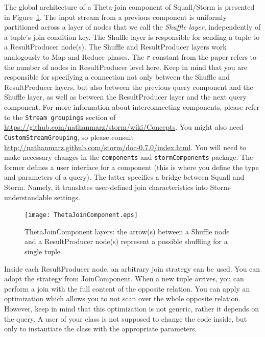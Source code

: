 \documentclass[a4paper,10pt]{article}
\begin{document}
The global architecture of a Theta-join component of Squall/Storm is presented in Figure~\ref{fig:ThetaJoinComponent}. The input stream from a previous component is uniformly partitioned across a layer of nodes that we call the \textit{Shuffle layer}, independently of a tuple's join condition key. The Shuffle layer is responsible for sending a tuple to a ResultProducer node(s). The Shuffle and ResultProducer layers work analogously to Map and Reduce phases. The \verb#r# constant from the paper refers to the number of nodes in ResultProducer level here. Keep in mind that you are responsible for specifying a connection not only between the Shuffle and ResultProducer layers, but also between the previous query component and the Shuffle layer, as well as between the ResultProducer layer and the next query component. For more information about interconnecting components, please refer to the \verb#Stream groupings# section of \url{https://github.com/nathanmarz/storm/wiki/Concepts}. You might also need \verb#CustomStreamGrouping#, so please consult \url{http://nathanmarz.github.com/storm/doc-0.7.0/index.html}. You will need to make necessary changes in the \verb#components# and \verb#stormComponents# package. The former defines a user interface for a component (this is where you define the type and parameters of a query). The latter specifies a bridge between Squall and Storm. Namely, it translates user-defined join characteristics into Storm-understandable settings.

\begin{figure}
\centering
\texttt{[image: ThetaJoinComponent.eps]}
\vspace{-3mm}
\caption{ThetaJoinComponent layers: the arrow(s) between a Shuffle node and a ResultProducer node(s) represent a possible shuffling for a single tuple.}
\label{fig:ThetaJoinComponent}
\vspace{-2mm}
\end{figure}

Inside each ResultProducer node, an arbitrary join strategy can be used. You can adopt the strategy from JoinComponent. When a new tuple arrives, you can perform a join with the full content of the opposite relation. You can apply an optimization which allows you to not scan over the whole opposite relation. However, keep in mind that this optimization is not generic, rather it depends on the query. A user of your class is not supposed to change the code inside, but only to instantiate the class with the appropriate parameters.
\end{document}
